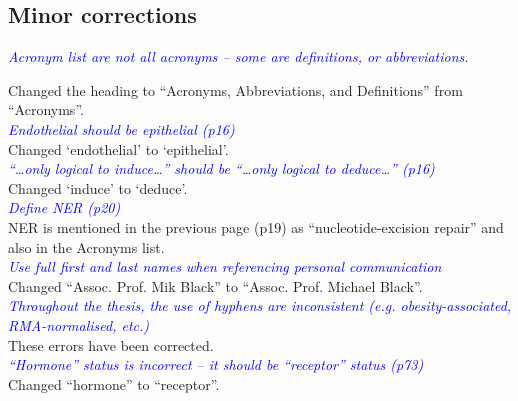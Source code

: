 \documentclass[a4paper, 12pt]{article}
\begin{document}
\subsection*{Minor corrections}
\label{sub:minor_corrections}

\noindent
\textcolor{blue}{
\textit{Acronym list are not all acronyms -- some are definitions, or abbreviations.
}
}

\noindent
Changed the heading to ``Acronyms, Abbreviations, and Definitions'' from ``Acronyms''.
\\

\noindent
\textcolor{blue}{
\textit{Endothelial should be epithelial (p16)
}
}\\

\noindent
Changed `endothelial' to `epithelial'.
\\

\noindent
\textcolor{blue}{
\textit{``\ldots only logical to induce\ldots'' should be ``\ldots only logical to deduce\ldots'' (p16)
}
}\\

\noindent
Changed `induce' to `deduce'.
\\

\noindent
\textcolor{blue}{
\textit{Define NER (p20)
}
}\\

\noindent
NER is mentioned in the previous page (p19) as ``nucleotide-excision repair'' and also in the Acronyms list.
\\

\noindent
\textcolor{blue}{
\textit{Use full first and last names when referencing personal communication
}
}\\

\noindent
Changed ``Assoc. Prof. Mik Black'' to ``Assoc. Prof. Michael Black''.
\\

\noindent
\textcolor{blue}{
\textit{Throughout the thesis, the use of hyphens are inconsistent (e.g. obesity-associated, RMA-normalised, etc.)
}
}\\

\noindent
These errors have been corrected.
\\

\noindent
\textcolor{blue}{
\textit{``Hormone'' status is incorrect -- it should be ``receptor'' status (p73)
}
}\\

\noindent
Changed ``hormone'' to ``receptor''.
\\
\end{document}
